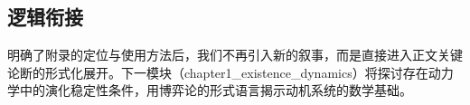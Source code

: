 \documentclass[../main.tex]{subfiles}
\begin{document}
	\subsection{逻辑衔接}
		明确了附录的定位与使用方法后，我们不再引入新的叙事，而是直接进入正文关键论断的形式化展开。下一模块（chapter1\_existence\_dynamics）将探讨存在动力学中的演化稳定性条件，用博弈论的形式语言揭示动机系统的数学基础。
	
	
	
	
	
	
	
	
\end{document}
